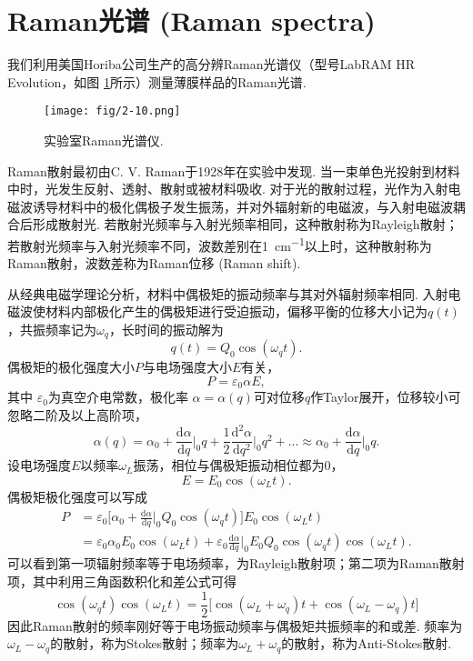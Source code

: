 \documentclass[12pt,a4paper,openany,twoside,UTF-8]{book}
\begin{document}
\section{Raman光谱 (Raman spectra)}
我们利用美国Horiba公司生产的高分辨Raman光谱仪（型号LabRAM HR Evolution，如图 \ref{fig:2-10}所示）测量薄膜样品的Raman光谱. 

\begin{figure}[htbp]
\centering
\texttt{[image: fig/2-10.png]}
\caption{实验室Raman光谱仪.}
\label{fig:2-10} 
\end{figure}

Raman散射最初由C. V. Raman于1928年在实验中发现. 当一束单色光投射到材料中时，光发生反射、透射、散射或被材料吸收. 对于光的散射过程，光作为入射电磁波诱导材料中的极化偶极子发生振荡，并对外辐射新的电磁波，与入射电磁波耦合后形成散射光. 若散射光频率与入射光频率相同，这种散射称为Rayleigh散射；若散射光频率与入射光频率不同，波数差别在\SI{1}{cm^{-1}}以上时，这种散射称为Raman散射，波数差称为Raman位移 (Raman shift).

从经典电磁学理论分析，材料中偶极矩的振动频率与其对外辐射频率相同. 入射电磁波使材料内部极化产生的偶极矩进行受迫振动，偏移平衡的位移大小记为$q(t)$，共振频率记为$\omega_q$，长时间的振动解为
$$q(t)=Q_0\cos(\omega_qt).$$
偶极矩的极化强度大小$P$与电场强度大小$E$有关，
$$P=\varepsilon_0\alpha E,$$
其中 $\varepsilon_0$为真空介电常数，极化率 $\alpha = \alpha(q)$可对位移$q$作Taylor展开，位移较小可忽略二阶及以上高阶项，
$$\alpha(q) = \alpha_0 + \frac{\mathrm{d}\alpha}{\mathrm{d}q}\Big|_{0}q + \frac{1}{2}\frac{\mathrm{d}^2\alpha}{\mathrm{d}q^2}\Big|_{0}q^2 + ... \approx \alpha_0 + \frac{\mathrm{d}\alpha}{\mathrm{d}q}\Big|_{0}q.$$
设电场强度$E$以频率$\omega_L$振荡，相位与偶极矩振动相位都为0，
$$E = E_0\cos(\omega_Lt).$$
偶极矩极化强度可以写成
\begin{align*}
  P &= \varepsilon_0\Big[\alpha_0 + \frac{\mathrm{d}\alpha}{\mathrm{d}q}\Big|_{0}Q_0\cos(\omega_qt)\Big]E_0\cos(\omega_Lt) \\
    &= \varepsilon_0\alpha_0E_0\cos(\omega_Lt)+\varepsilon_0\frac{\mathrm{d}\alpha}{\mathrm{d}q}\Big|_{0}E_0Q_0\cos(\omega_qt)\cos(\omega_Lt).
\end{align*}
可以看到第一项辐射频率等于电场频率，为Rayleigh散射项；第二项为Raman散射项，其中利用三角函数积化和差公式可得
$$\cos(\omega_qt)\cos(\omega_Lt)=\frac{1}{2}\Big[\cos(\omega_L+\omega_q)t+\cos(\omega_L-\omega_q)t\Big]$$
因此Raman散射的频率刚好等于电场振动频率与偶极矩共振频率的和或差. 频率为$\omega_L-\omega_q$的散射，称为Stokes散射；频率为$\omega_L+\omega_q$的散射，称为Anti-Stokes散射.
\end{document}
